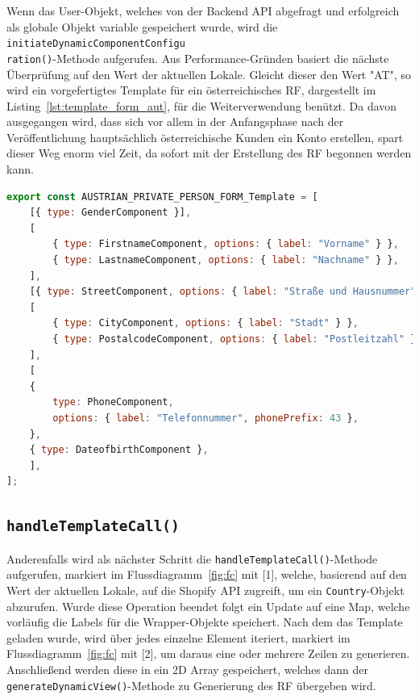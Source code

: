Wenn das User-Objekt, welches von der Backend API abgefragt und erfolgreich als globale Objekt variable gespeichert wurde, wird die \texttt{initiateDynamicComponentConfigu\\ration()}-Methode aufgerufen. Aus Performance-Gründen basiert die nächste Überprüfung auf den Wert der aktuellen Lokale. Gleicht dieser den Wert "AT", so wird ein vorgefertigtes Template für ein österreichisches RF, dargestellt im Listing~\ref{lst:template_form_aut}, für die Weiterverwendung benützt. Da davon ausgegangen wird, dass sich vor allem in der Anfangsphase nach der Veröffentlichung hauptsächlich österreichische Kunden ein Konto erstellen, spart dieser Weg enorm viel Zeit, da sofort mit der Erstellung des RF begonnen werden kann.

\begin{lstlisting}[caption={Vordefiniertes Template für das RF},captionpos=b, language=JavaScript,label={lst:template_form_aut}]
export const AUSTRIAN_PRIVATE_PERSON_FORM_Template = [
	[{ type: GenderComponent }],
	[
		{ type: FirstnameComponent, options: { label: "Vorname" } },
		{ type: LastnameComponent, options: { label: "Nachname" } },
	],
	[{ type: StreetComponent, options: { label: "Straße und Hausnummer" } }],
	[
		{ type: CityComponent, options: { label: "Stadt" } },
		{ type: PostalcodeComponent, options: { label: "Postleitzahl" } },
	],
	[
	{
		type: PhoneComponent,
		options: { label: "Telefonnummer", phonePrefix: 43 },
	},
	{ type: DateofbirthComponent },
	],
];
\end{lstlisting}

\subsection{\texttt{handleTemplateCall()}}

Anderenfalls wird als nächster Schritt die \texttt{handleTemplateCall()}-Methode aufgerufen, markiert im Flussdiagramm~\ref{fig:fc} mit [1], welche, basierend auf den Wert der aktuellen Lokale, auf die Shopify API zugreift, um ein \texttt{Country}-Objekt abzurufen. Wurde diese Operation beendet folgt ein Update auf eine Map, welche vorläufig die Labels für die Wrapper-Objekte speichert. Nach dem das Template geladen wurde, wird über jedes einzelne Element iteriert, markiert im Flussdiagramm~\ref{fig:fc} mit [2], um daraus eine oder mehrere Zeilen zu generieren. Anschließend werden diese in ein 2D Array gespeichert, welches dann der \texttt{generateDynamicView()}-Methode zu Generierung des RF übergeben wird. 

